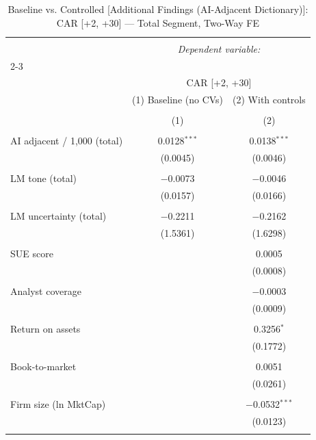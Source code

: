 
\begin{table}[!htbp] \centering 
  \caption{Baseline vs. Controlled [Additional Findings (AI-Adjacent Dictionary)]: CAR [+2, +30] — Total Segment, Two-Way FE} 
  \label{} 
\begin{tabular}{@{\extracolsep{5pt}}lcc} 
\\[-1.8ex]\hline 
\hline \\[-1.8ex] 
 & \multicolumn{2}{c}{\textit{Dependent variable:}} \\ 
\cline{2-3} 
\\[-1.8ex] & \multicolumn{2}{c}{CAR [+2, +30]} \\ 
 & (1) Baseline (no CVs) & (2) With controls \\ 
\\[-1.8ex] & (1) & (2)\\ 
\hline \\[-1.8ex] 
 AI adjacent / 1,000 (total) & 0.0128$^{***}$ & 0.0138$^{***}$ \\ 
  & (0.0045) & (0.0046) \\ 
  & & \\ 
 LM tone (total) & $-$0.0073 & $-$0.0046 \\ 
  & (0.0157) & (0.0166) \\ 
  & & \\ 
 LM uncertainty (total) & $-$0.2211 & $-$0.2162 \\ 
  & (1.5361) & (1.6298) \\ 
  & & \\ 
 SUE score &  & 0.0005 \\ 
  &  & (0.0008) \\ 
  & & \\ 
 Analyst coverage &  & $-$0.0003 \\ 
  &  & (0.0009) \\ 
  & & \\ 
 Return on assets &  & 0.3256$^{*}$ \\ 
  &  & (0.1772) \\ 
  & & \\ 
 Book-to-market &  & 0.0051 \\ 
  &  & (0.0261) \\ 
  & & \\ 
 Firm size (ln MktCap) &  & $-$0.0532$^{***}$ \\ 
  &  & (0.0123) \\ 
  & & \\ 

\end{tabular}
\end{table}
